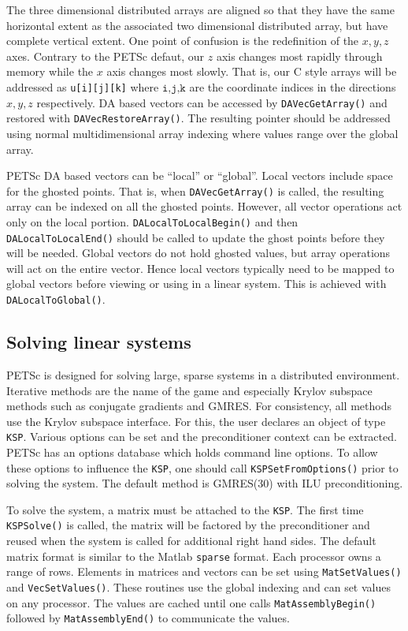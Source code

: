 \documentclass[11pt,final]{amsart}
\renewcommand{\t}[1]{\texttt{#1}}
\begin{document}
The three dimensional distributed arrays are aligned so that they have the same horizontal
extent as the associated two dimensional distributed array, but have complete vertical
extent. One point of confusion is the redefinition of the $x,y,z$ axes. Contrary to the
PETSc defaut, our $z$ axis changes most rapidly through memory while the $x$ axis changes
most slowly. That is, our C style arrays will be addressed as \texttt{u[i][j][k]} where
$\texttt{i,j,k}$ are the coordinate indices in the directions $x,y,z$ respectively. DA
based vectors can be accessed by \texttt{DAVecGetArray()} and restored with
\texttt{DAVecRestoreArray()}. The resulting pointer should be addressed using normal
multidimensional array indexing where values range over the global array.

PETSc DA based vectors can be ``local'' or ``global''. Local vectors include space for the
ghosted points. That is, when \texttt{DAVecGetArray()} is called, the resulting array can
be indexed on all the ghosted points. However, all vector operations act only on the local
portion. \texttt{DALocalToLocalBegin()} and then \texttt{DALocalToLocalEnd()} should be
called to update the ghost points before they will be needed. Global vectors do not hold
ghosted values, but array operations will act on the entire vector. Hence local vectors
typically need to be mapped to global vectors before viewing or using in a linear system.
This is achieved with \texttt{DALocalToGlobal()}.

\subsection{Solving linear systems}
PETSc is designed for solving large, sparse systems in a distributed environment.
Iterative methods are the name of the game and especially Krylov subspace methods such as
conjugate gradients and GMRES. For consistency, all methods use the Krylov subspace
interface. For this, the user declares an object of type \texttt{KSP}. Various options can
be set and the preconditioner context can be extracted. PETSc has an options database
which holds command line options. To allow these options to influence the \t{KSP}, one
should call \t{KSPSetFromOptions()} prior to solving the system. The default method is
GMRES(30) with ILU preconditioning.

To solve the system, a matrix must be attached to the \t{KSP}. The first time
\t{KSPSolve()} is called, the matrix will be factored by the preconditioner and reused
when the system is called for additional right hand sides. The default matrix format is
similar to the Matlab \t{sparse} format. Each processor owns a range of rows. Elements in
matrices and vectors can be set using \t{MatSetValues()} and \t{VecSetValues()}. These
routines use the global indexing and can set values on any processor. The values are
cached until one calls \t{MatAssemblyBegin()} followed by \t{MatAssemblyEnd()} to
communicate the values.
\end{document}
